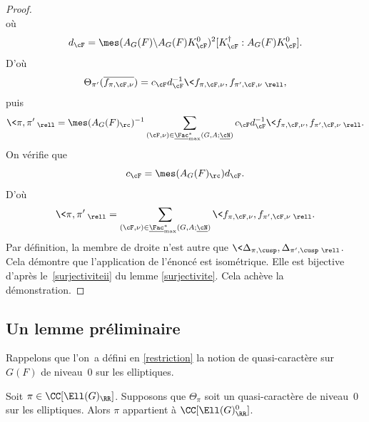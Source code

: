 \begin{proof}
\[\]
où
\[
d_{\cF}=\mes(A_{G}(F)\backslash A_{G}(F)K_{\cF}^0)^2[K_{\cF}^{\dag}:A_{G}(F)K_{\cF}^0].
\]
D'où
\[
\Theta_{\pi'}(\overline{f_{\pi,\cF,\nu}})= c_{\cF}d_{\cF}^{-1}\<f_{\pi,\cF,\nu},f_{\pi',\cF,\nu}\>_{\rell},
\]
puis
\[
\<\pi,\pi'\>_{\rell}=\mes(A_{G}(F)_{\rc})^{-1}\sum_{(\cF,\nu)\in \underline{\Fac}^*_{\max}(G,A;\underline{\cN})} c_{\cF}d_{\cF}^{-1}\<f_{\pi,\cF,\nu},f_{\pi',\cF,\nu}\>_{\rell}.
\]
On vérifie que
\[
c_{\cF}=\mes(A_{G}(F)_{\rc}) d_{\cF}.
\]
D'où
\[
\<\pi,\pi'\>_{\rell}=\sum_{(\cF,\nu)\in \underline{\Fac}^*_{\max}(G,A;\underline{\cN})}\<f_{\pi,\cF,\nu},f_{\pi',\cF,\nu}\>_{\rell}.
\]
Par définition, la membre de droite n'est autre que $\<\Delta_{\pi,\cusp},\Delta_{\pi',\cusp}\>_{\rell}$. Cela démontre que l'application de l'énoncé est isométrique. Elle est bijective d'après le~\eqref{surjectiviteii} du lemme \ref{surjectivite}. Cela achève la démonstration.
\end{proof}

\subsection{Un lemme préliminaire}\label{unlemme}

Rappelons que l'on~a défini en \ref{restriction} la notion de quasi-caractère sur $G(F)$ de niveau~$0$ sur les elliptiques.

\begin{lem*}
Soit $\pi\in \CC[\Ell(G)_{\RR}]$. Supposons que $\Theta_{\pi}$ soit un quasi-caractère de niveau~$0$ sur les elliptiques. Alors $\pi$ appartient à $\CC[\Ell(G)^0_{\RR}]$.
\end{lem*}

